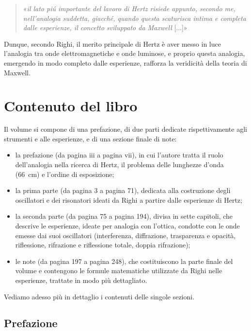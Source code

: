 \begin{quote}
«\textit{il lato piú importante del lavoro di Hertz
risiede appunto, secondo me, nell'analogia suddetta, giacché,
quando questa scaturisca intima e completa dalle esperienze,
il concetto sviluppato da Maxwell} [...]»
\cite[p.~iii]{righi1897ottica}
\end{quote}

Dunque, secondo Righi, il merito principale di Hertz è aver messo in luce l'analogia tra onde elettromagnetiche e onde luminose, e
proprio questa analogia, emergendo in modo completo dalle esperienze, rafforza la veridicità della teoria di Maxwell.


\section{Contenuto del libro}

Il volume si compone di una prefazione, di due parti dedicate rispettivamente agli strumenti e alle esperienze,
e di una sezione finale di note:

\begin{itemize}
    \item la prefazione (da pagina iii a pagina vii), in cui l'autore tratta
    il ruolo dell'analogia nella ricerca di Hertz, il problema delle
    lunghezze d'onda (66~cm) e l'ordine di esposizione;
    \item la prima parte (da pagina 3 a pagina 71), dedicata alla costruzione
    degli oscillatori e dei risonatori ideati da Righi a partire dalle
    esperienze di Hertz;
    \item la seconda parte (da pagina 75 a pagina 194), divisa in sette
    capitoli, che descrive le esperienze, ideate per analogia con l'ottica,
    condotte con le onde emesse dai suoi oscillatori (interferenza,
    diffrazione, trasparenza e opacità, riflessione, rifrazione e riflessione
    totale, doppia rifrazione);
    \item le note (da pagina 197 a pagina 248), che costituiscono la parte
    finale del volume e contengono le formule matematiche utilizzate da Righi
    nelle esperienze, trattate in modo più dettagliato.
\end{itemize}

Vediamo adesso più in dettaglio i contenuti delle singole sezioni.

\subsection{Prefazione}

